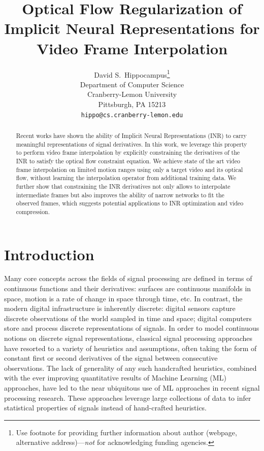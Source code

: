 \documentclass{article}
\title{Optical Flow Regularization of Implicit Neural Representations for Video Frame Interpolation}
\author{%
  David S.~Hippocampus\thanks{Use footnote for providing further information
    about author (webpage, alternative address)---\emph{not} for acknowledging
    funding agencies.} \\
  Department of Computer Science\\
  Cranberry-Lemon University\\
  Pittsburgh, PA 15213 \\
  \texttt{hippo@cs.cranberry-lemon.edu} \\
}
\begin{document}
\maketitle


\begin{abstract}
Recent works have shown the ability of Implicit Neural Representations (INR) to carry meaningful representations of signal derivatives.
In this work, we leverage this property to perform video frame interpolation
by explicitly constraining the derivatives of the INR to satisfy the optical flow constraint equation.
We achieve state of the art video frame interpolation on limited motion ranges
using only a target video and its optical flow, without learning the interpolation operator from additional training data.
We further show that constraining the INR derivatives not only
allows to interpolate intermediate frames but also improves the ability of narrow networks to fit the observed frames,
which suggests potential applications to INR optimization and video compression.
\end{abstract}

\section{Introduction}


Many core concepts across the fields of signal processing are defined in terms of continuous functions and their derivatives:
surfaces are continuous manifolds in space,
motion is a rate of change in space through time, etc.
In contrast, the modern digital infrastructure is inherently discrete:
digital sensors capture discrete observations of the world sampled in time and space;
digital computers store and process discrete representations of signals.
In order to model continuous notions on discrete signal representations,
classical signal processing approaches have resorted to a variety of heuristics and assumptions,
often taking the form of constant first or second derivatives of the signal between consecutive observations.
The lack of generality of any such handcrafted heuristics,
combined with the ever improving quantitative results of Machine Learning (ML) approaches,
have led to the near ubiquitous use of ML approaches in recent signal processing research.
These approaches leverage large collections of data to infer statistical properties of signals instead of hand-crafted heuristics.
\end{document}

